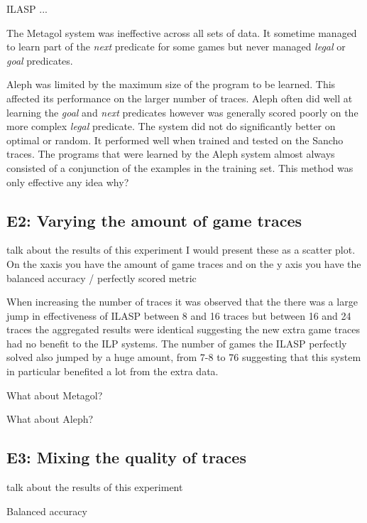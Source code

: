 \ac{ILASP ...}

The Metagol system was ineffective across all sets of data. It sometime managed to learn part of the \textit{next} predicate for some games but never managed \textit{legal} or \textit{goal} predicates.

Aleph was limited by the maximum size of the program to be learned. This affected its performance on the larger number of traces. Aleph often did well at learning the \textit{goal} and \textit{next} predicates however was generally scored poorly on the more complex \textit{legal} predicate. The system did not do significantly better on optimal or random. It performed well when trained and tested on the Sancho traces.
The programs that were learned by the Aleph system almost always consisted of a conjunction of the examples in the training set. This method was only effective \ac{any idea why?}


\subsection{E2: Varying the amount of game traces}
\ac{talk about the results of this experiment}
\ac{
	I would present these as a scatter plot. On the xaxis you have the amount of game traces and on the y axis you have the balanced accuracy / perfectly scored metric
}


When increasing the number of traces it was observed that the there was a large jump in effectiveness of ILASP between 8 and 16 traces but between 16 and 24 traces the aggregated results were identical suggesting the new extra game traces had no benefit to the ILP systems. The number of games the ILASP perfectly solved also jumped by a huge amount, from 7-8 to 76 suggesting that this system in particular benefited a lot from the extra data.

\ac{What about Metagol?}

\ac{What about Aleph?}


\subsection{E3: Mixing the quality of traces}
\ac{talk about the results of this experiment}









Balanced accuracy

